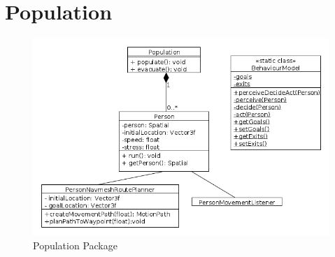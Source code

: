 %

\section{Population}
\label{Des:sec:population}
\begin{figure}[here]
\centering
\includegraphics[scale = 0.5]{../UMLDiagrams/PopulationModel.png}
\caption{Population Package}
\label{fig:populationmodel}
\end{figure}


